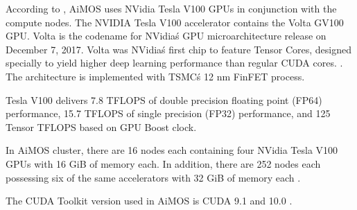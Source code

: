 
According to \cite{aimosibm}, AiMOS uses NVidia Tesla V100 GPUs in conjunction with the compute nodes. The NVIDIA Tesla V100 accelerator contains the Volta GV100 GPU. Volta is the codename for NVidia\'s GPU microarchitecture release on December 7, 2017. Volta was NVidia\'s first chip to feature Tensor Cores, designed specially to yield higher deep learning performance than regular CUDA cores. \cite{volta2017}. The architecture is implemented with TSMC\'s 12 nm FinFET process.

Tesla V100 delivers 7.8 TFLOPS of double precision floating point (FP64) performance, 15.7 TFLOPS of single precision (FP32) performance, and 125 Tensor TFLOPS based on GPU Boost clock. 

In AiMOS cluster, there are 16 nodes each containing four NVidia Tesla V100 GPUs with 16 GiB of memory each. In addition, there are 252 nodes each possessing six of the same accelerators with 32 GiB of memory each \cite{DCSsupercomputer}.

The CUDA Toolkit version used in AiMOS is CUDA 9.1 and 10.0 \cite{DCSsupercomputer}.